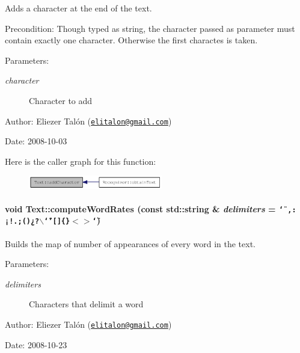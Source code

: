 Adds a character at the end of the text. 

\begin{Desc}
\item[Precondition:]Though typed as string, the character passed as parameter must contain exactly one character. Otherwise the first charactes is taken.\end{Desc}
\begin{Desc}
\item[Parameters:]
\begin{description}
\item[{\em character}]Character to add\end{description}
\end{Desc}
\begin{Desc}
\item[Author:]Eliezer Talón (\href{mailto:elitalon@gmail.com}{\tt elitalon@gmail.com}) \end{Desc}
\begin{Desc}
\item[Date:]2008-10-03 \end{Desc}


Here is the caller graph for this function:\nopagebreak
\begin{figure}[H]
\begin{center}
\leavevmode
\includegraphics[width=166pt]{class_text_d2c0cb733cef33657a44e4efc9e518ee_icgraph}
\end{center}
\end{figure}
\hypertarget{class_text_e954a35628c72537e2ee5ca6e9609ac1}{
\paragraph[{computeWordRates}]{\setlength{\rightskip}{0pt plus 5cm}void Text::computeWordRates (const std::string \& {\em delimiters} = {\tt \char`\"{}~,:¡!.;()¿?$\backslash$\char`\"{}'\mbox{[}\mbox{]}\{\}$<$$>$\char`\"{}})}\hfill}
\label{class_text_e954a35628c72537e2ee5ca6e9609ac1}


Builds the map of number of appearances of every word in the text. 

\begin{Desc}
\item[Parameters:]
\begin{description}
\item[{\em delimiters}]Characters that delimit a word\end{description}
\end{Desc}
\begin{Desc}
\item[Author:]Eliezer Talón (\href{mailto:elitalon@gmail.com}{\tt elitalon@gmail.com}) \end{Desc}
\begin{Desc}
\item[Date:]2008-10-23 \end{Desc}


